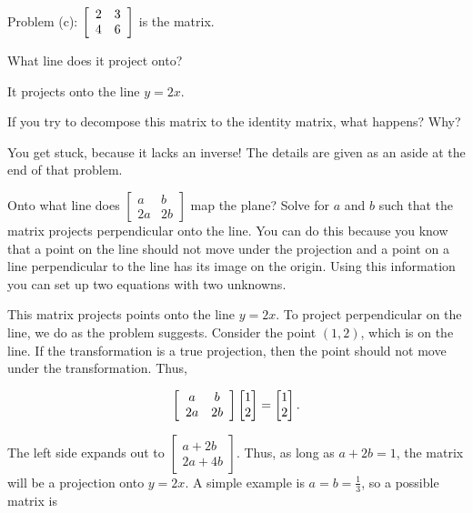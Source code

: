 \documentclass[../key.tex]{subfiles}
\begin{document}
Problem (c): $\left[\begin{array}{cc} 2 & 3 \\ 4 & 6 \end{array}\right]$ is the matrix.

\begin{inner_problem}
\item What line does it project onto?
\end{inner_problem}

It projects onto the line $y=2x$.

\begin{inner_problem}
\item If you try to decompose this matrix to the identity matrix, what happens? Why?
\end{inner_problem}

You get stuck, because it lacks an inverse! The details are given as an aside at the end of that problem.

\begin{outer_problem}
\item Onto what line does $\left[\begin{smallmatrix} a & b \\ 2a & 2b\end{smallmatrix}\right]$ map the plane? Solve for $a$ and $b$ such that the matrix projects perpendicular onto the line. You can do this because you know that a point on the line should not move under the projection and a point on a line perpendicular to the line has its image on the origin. Using this information you can set up two equations with two unknowns. \label{prob:project_the_plane}
\end{outer_problem}

This matrix projects points onto the line $y=2x$. To project perpendicular on the line, we do as the problem suggests. Consider the point $(1,2)$, which is on the line. If the transformation is a true projection, then the point should not move under the transformation. Thus,

$$\left[\begin{array}{cc} a & b \\ 2a & 2b \end{array}\right]\begin{bmatrix} 1 \\ 2 \end{bmatrix} = \begin{bmatrix} 1 \\ 2 \end{bmatrix}.$$

The left side expands out to $\begin{bmatrix} a+2b \\ 2a+4b \end{bmatrix}$. Thus, as long as $a+2b=1$, the matrix will be a projection onto $y=2x$. A simple example is $a=b=\frac{1}{3}$, so a possible matrix is
\end{document}
